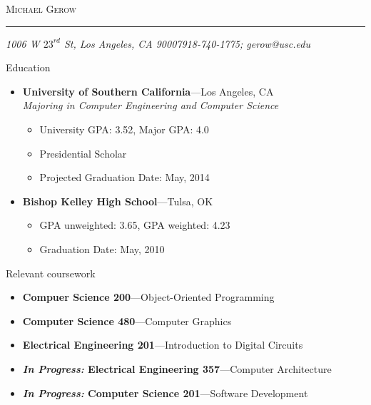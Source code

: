 \documentclass[10pt,oneside]{article}
\makeatletter
\newcommand{\name}{Michael Gerow}
\newcommand{\addr}{1006 W $23^{rd}$ St, Los Angeles, CA 90007}
\newcommand{\phone}{918-740-1775}
\newcommand{\email}{gerow@usc.edu}
\newcommand{\bigname}[1]{
	\begin{center}\fontfamily{phv}\selectfont\Huge\scshape#1\end{center}
}
\newenvironment{ressection}[1]{
	\vspace{4pt}
	{\fontfamily{phv}\selectfont\Large#1}
	\begin{itemize}
	\vspace{3pt}
}{
	\end{itemize}
}
\newcommand{\ressubitem}[1]{
	\vspace{-1pt}
	\item \begin{flushleft} #1 \end{flushleft}
}
\newcommand{\resbigitem}[3]{
	\vspace{-5pt}
	\item
	\textbf{#1}---#2 \\
	\textit{#3}
}
\newcommand{\resshortbigitem}[2]{
	\vspace{-5pt}
	\item
	\textbf{#1}---#2
}
\newenvironment{ressubsec}[3]{
	\resbigitem{#1}{#2}{#3}
	\vspace{-2pt}
	\begin{itemize}
}{
	\end{itemize}
}
\newenvironment{resshortsubsec}[2]{
	\resshortbigitem{#1}{#2}
	\vspace{-2pt}
	\begin{itemize}
}{
	\end{itemize}
}
\makeatother
\begin{document}
 \selectfont

\bigname{\name}

\vspace{-8pt} \rule{\textwidth}{1pt}

\vspace{-1pt} {\small\itshape \addr \hfill \phone; \email}

\vspace{8 pt}




\begin{ressection}{Education}

	\begin{ressubsec}{University of Southern California}{Los Angeles, CA}{Majoring in Computer Engineering and Computer Science}
		\ressubitem{University GPA:  3.52, Major GPA: 4.0}
		\ressubitem{Presidential Scholar}
		\ressubitem{Projected Graduation Date:  May, 2014}
	\end{ressubsec}
	\begin{resshortsubsec}{Bishop Kelley High School}{Tulsa, OK}{}
		\ressubitem{GPA unweighted: 3.65, GPA weighted: 4.23}
		\ressubitem{Graduation Date: May, 2010}
	\end{resshortsubsec}

\end{ressection}



\begin{ressection}{Relevant coursework}
	\resshortbigitem{Compuer Science 200}{Object-Oriented Programming}
	\resshortbigitem{Computer Science 480}{Computer Graphics}
	\resshortbigitem{Electrical Engineering 201}{Introduction to Digital Circuits}
	\resshortbigitem{\emph{In Progress:} Electrical Engineering 357}{Computer Architecture}
	\resshortbigitem{\emph{In Progress:} Computer Science 201}{Software Development}
\end{ressection}
\end{document}

